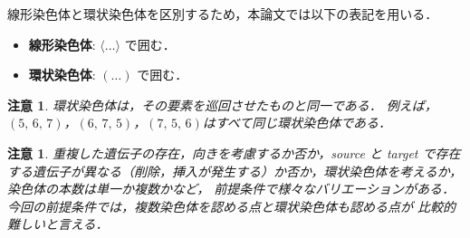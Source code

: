 \documentclass[paper=a4,fontsize=11pt,report,oneside]{jlreq}
\newtheorem{remark}[theorem]{注意}
\begin{document}
線形染色体と環状染色体を区別するため，本論文では以下の表記を用いる．
\begin{itemize}
    \item \textbf{線形染色体}: $\langle \dots \rangle$ で囲む．
    \item \textbf{環状染色体}: $( \dots )$ で囲む．
\end{itemize}

\begin{remark}
環状染色体は，その要素を巡回させたものと同一である．
例えば，$(5,\,6,\,7)$，$(6,\,7,\,5)$，$(7,\,5,\,6)$はすべて同じ環状染色体である．
\end{remark}

\begin{remark}
重複した遺伝子の存在，向きを考慮するか否か，\textit{source} と \textit{target}
で存在する遺伝子が異なる（削除，挿入が発生する）か否か，環状染色体を考えるか，
染色体の本数は単一か複数かなど，
前提条件で様々なバリエーションがある．
今回の前提条件では，複数染色体を認める点と環状染色体も認める点が
比較的難しいと言える．
\end{remark}
\end{document}
